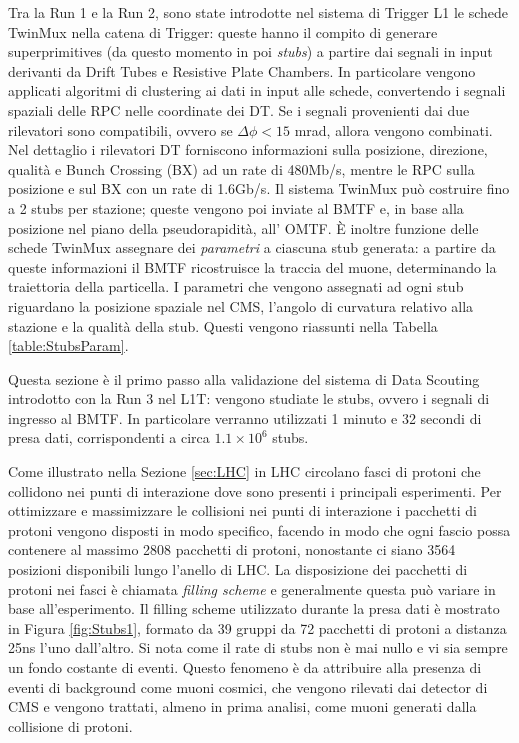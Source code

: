Tra la Run 1 e la Run 2, sono state introdotte nel sistema di Trigger L1 le schede TwinMux nella catena di Trigger: queste hanno il compito di generare superprimitives (da questo momento in poi \textit{stubs}) a partire dai segnali in input derivanti da Drift Tubes e Resistive Plate Chambers. \newline
In particolare vengono applicati algoritmi di clustering ai dati in input alle schede, convertendo i segnali spaziali delle RPC nelle coordinate dei DT. Se i segnali provenienti dai due rilevatori sono compatibili, ovvero se $\Delta \phi < 15$ \si{mrad}, allora vengono combinati. Nel dettaglio i rilevatori DT forniscono informazioni sulla posizione, direzione, qualità e Bunch Crossing (BX) ad un rate di 480Mb/s, mentre le RPC sulla posizione e sul BX con un rate di 1.6Gb/s.\newline
Il sistema TwinMux può costruire fino a 2 stubs per stazione; queste vengono poi inviate al BMTF e, in base alla posizione nel piano della pseudorapidità, all' OMTF. \newline
È inoltre funzione delle schede TwinMux assegnare dei \textit{parametri} a ciascuna stub generata: a partire da queste informazioni il BMTF ricostruisce la traccia del muone, determinando la traiettoria della particella. I parametri che vengono assegnati ad ogni stub riguardano la posizione spaziale nel CMS, l'angolo di curvatura relativo alla stazione e la qualità della stub. Questi vengono riassunti nella Tabella \ref{table:StubsParam}.

Questa sezione è il primo passo alla validazione del sistema di Data Scouting introdotto con la Run 3 nel L1T: vengono studiate le stubs, ovvero i segnali di ingresso al BMTF. In particolare verranno utilizzati 1 minuto e 32 secondi di presa dati, corrispondenti a circa $1.1 \times 10^{6}$ stubs. 

Come illustrato nella Sezione \ref{sec:LHC} in LHC circolano fasci di protoni che collidono nei punti di interazione dove sono presenti i principali esperimenti. Per ottimizzare e massimizzare le collisioni nei punti di interazione i pacchetti di protoni vengono disposti in modo specifico, facendo in modo che ogni fascio possa contenere al massimo 2808 pacchetti di protoni, nonostante ci siano 3564 posizioni disponibili lungo l'anello di LHC. La disposizione dei pacchetti di protoni nei fasci è chiamata \textit{filling scheme} e generalmente questa può variare in base all'esperimento. Il filling scheme utilizzato durante la presa dati è mostrato in Figura \ref{fig:Stubs1}, formato da 39 gruppi da 72 pacchetti di protoni a distanza 25ns l'uno dall'altro\cite{Bailey}. \newline
Si nota come il rate di stubs non è mai nullo e vi sia sempre un fondo costante di eventi. Questo fenomeno è da attribuire alla presenza di eventi di background come muoni cosmici, che vengono rilevati dai detector di CMS e vengono trattati, almeno in prima analisi, come muoni generati dalla collisione di protoni.




